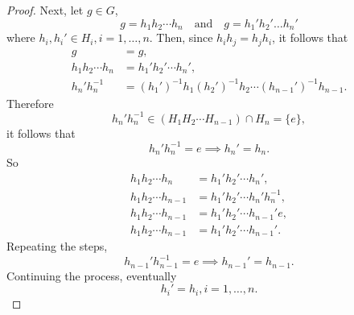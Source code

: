 \documentclass{article}
\theoremstyle{definition}
\begin{document}
\begin{proof}
           Next, let $g \in G$,
           \begin{equation*}
               g=h_1h_2 \cdots h_n \quad \text{and} \quad g = h_1'h_2' \dots h_n'
           \end{equation*}
           where $h_i,h_i' \in H_i, i=1,\dots,n$. Then, since $h_ih_j=h_jh_i$, it follows that
           \begin{align*}
                g &= g, \\
                h_1h_2 \cdots h_n &= h_1'h_2' \cdots h_n', \\
                h_n'h_n^{-1} &= (h_1')^{-1}h_1(h_2')^{-1}h_2 \cdots (h_{n-1}')^{-1}h_{n-1}.
           \end{align*}
           Therefore
           \begin{equation*}
               h_n'h_n^{-1} \in (H_1H_2 \cdots H_{n-1}) \cap H_n = \{e\},
           \end{equation*}
           it follows that
           \begin{equation*}
               h_n'h_n^{-1} = e \implies h_n' = h_n.
           \end{equation*}
           So
           \begin{align*}
               h_1h_2 \cdots h_n &= h_1'h_2' \cdots h_n', \\
               h_1h_2 \cdots h_{n-1} &= h_1'h_2' \cdots h_n'h_n^{-1}, \\
               h_1h_2 \cdots h_{n-1} &= h_1'h_2' \cdots h_{n-1}'e, \\
               h_1h_2 \cdots h_{n-1} &= h_1'h_2' \cdots h_{n-1}'.
           \end{align*}
           Repeating the steps,
           \begin{equation*}
               h_{n-1}'h_{n-1}^{-1} = e \implies h_{n-1}'=h_{n-1}.
           \end{equation*}
           Continuing the process, eventually
           \begin{equation*}
               h_i' = h_i, i = 1,\dots,n.
           \end{equation*}
           

\end{proof}
\end{document}
